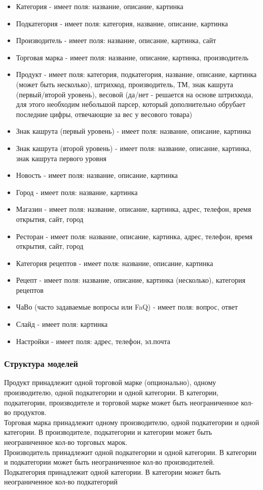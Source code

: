\documentclass[DIV=calc, paper=a4, fontsize=11pt]{scrartcl} %
\begin{document}
\begin{itemize}
	\item Категория - имеет поля: название, описание, картинка
	\item Подкатегория - имеет поля: категория, название, описание, картинка
	\item Производитель - имеет поля: название, описание, картинка, сайт
	\item Торговая марка - имеет поля: название, описание, картинка, производитель
	\item Продукт - имеет поля: категория, подкатегория, название, описание, картинка (может быть несколько), штрихкод, производитель, ТМ, знак кашрута (первый/второй уровень), весовой (да/нет - решается на основе штрихкода, для этого необходим небольшой парсер, который дополнительно обрубает последние цифры, отвечающие за вес у весового товара)
	\item Знак кашрута (первый уровень) - имеет поля: название, описание, картинка
	\item Знак кашрута (второй уровень) - имеет поля: название, описание, картинка, знак кашрута первого уровня
	\item Новость - имеет поля: название, описание, картинка
	\item Город - имеет поля: название, картинка
	\item Магазин - имеет поля: название, описание, картинка, адрес, телефон, время открытия, сайт, город
	\item Ресторан - имеет поля: название, описание, картинка, адрес, телефон, время открытия, сайт, город
	\item Категория рецептов - имеет поля: название, описание, картинка	
	\item Рецепт - имеет поля: название, описание, картинка (несколько), категория рецептов
	\item ЧаВо (часто задаваемые вопросы или FaQ) - имеет поля: вопрос, ответ
	\item Слайд - имеет поля: картинка
	\item Настройки - имеет поля: адрес, телефон, эл.почта
\end{itemize}

\subsubsection{Структура моделей}

Продукт принадлежит одной торговой марке (опционально), одному производителю, одной подкатегории и одной категории.
В категории, подкатегории, производителе и торговой марке может быть неограниченное кол-во продуктов.
\\[0.5cm]
Торговая марка принадлежит одному производителю, одной подкатегории и одной категории.
В производителе, подкатегории и категории может быть неограниченное кол-во торговых марок.
\\[0.5cm]
Производитель принадлежит одной подкатегории и одной категории.
В категории и подкатегории может быть неограниченное кол-во производителей.
\\[0.5cm]
Подкатегория принадлежит одной категории.
В категории может быть неограниченное кол-во подкатегорий
\end{document}
